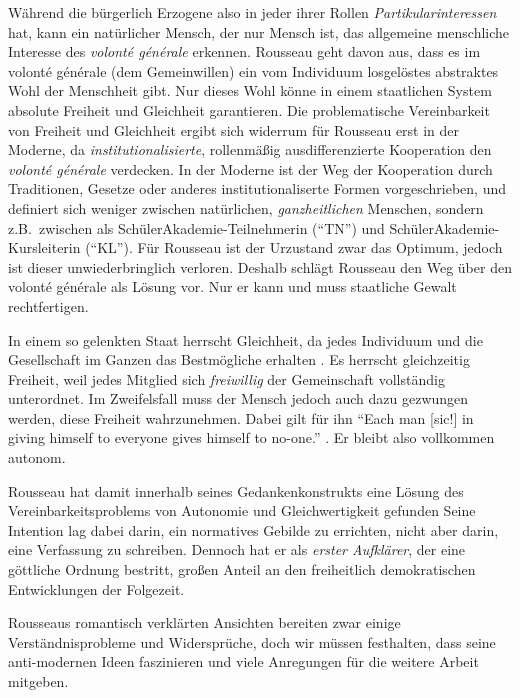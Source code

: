 Während die bürgerlich Erzogene also in jeder ihrer Rollen \emph{Partikularinteressen} hat, kann ein natürlicher Mensch, der nur Mensch ist, das allgemeine menschliche Interesse des \emph{volonté générale} erkennen.
Rousseau geht davon aus, dass es im volonté générale (dem Gemeinwillen) ein vom Individuum losgelöstes abstraktes Wohl der Menschheit gibt.
Nur dieses Wohl könne in einem staatlichen System absolute Freiheit und Gleichheit garantieren.
Die problematische Vereinbarkeit von Freiheit und Gleichheit ergibt sich widerrum für Rousseau erst in der Moderne, da \emph{institutionalisierte}, rollenmäßig ausdifferenzierte Kooperation den \emph{volonté générale} verdecken.
In der Moderne ist der Weg der Kooperation durch Traditionen, Gesetze oder anderes institutionaliserte Formen vorgeschrieben, und definiert sich weniger zwischen natürlichen, \emph{ganzheitlichen} Menschen, sondern z.B.\ zwischen als SchülerAkademie-Teilnehmerin (``TN'') und SchülerAkademie-Kursleiterin (``KL'').
Für Rousseau ist der Urzustand zwar das Optimum, jedoch ist dieser unwiederbringlich verloren.
Deshalb schlägt Rousseau den Weg über den volonté générale als Lösung vor.
Nur er kann und muss staatliche Gewalt rechtfertigen.

In einem so gelenkten Staat herrscht Gleichheit, da jedes Individuum und die Gesellschaft im Ganzen das Bestmögliche erhalten \parencite[7]{Rousseau-1762-b}.
Es herrscht gleichzeitig Freiheit, weil jedes Mitglied sich \emph{freiwillig} der Gemeinschaft vollständig unterordnet.
Im Zweifelsfall muss der Mensch jedoch auch dazu gezwungen werden, diese Freiheit wahrzunehmen.
Dabei gilt für ihn ``Each man [sic!] in giving himself to everyone gives himself to no-one.'' \parencite[7]{Rousseau-1762-b}.
Er bleibt also vollkommen autonom.

Rousseau hat damit innerhalb seines Gedankenkonstrukts eine Lösung des Vereinbarkeitsproblems von Autonomie und Gleichwertigkeit gefunden
Seine Intention lag dabei darin, ein normatives Gebilde zu errichten, nicht aber darin, eine Verfassung zu schreiben.
Dennoch hat er als \emph{erster Aufklärer}, der eine göttliche Ordnung bestritt, großen Anteil an den freiheitlich demokratischen Entwicklungen der Folgezeit.

Rousseaus romantisch verklärten Ansichten bereiten zwar einige Verständnisprobleme und Widersprüche, doch wir müssen festhalten, dass seine anti-modernen Ideen faszinieren und viele Anregungen für die weitere Arbeit mitgeben.
